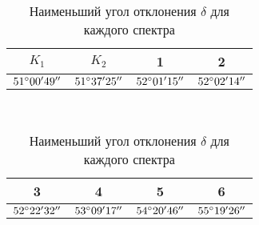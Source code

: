 \begin{table}[h!]
    \centering
    \begin{tabular}{|c|c|c|c|}
    \hline
    $K_1$                 & $K_2$                 & 1                     & 2                     \\ \hline
    $51 \degree 00' 49''$ & $51 \degree 37' 25''$ & $52 \degree 01' 15''$ & $52 \degree 02' 14''$ \\ \hline
    \end{tabular}
    \\[3 mm]
    \begin{tabular}{|c|c|c|c|}
        \hline
        3                     & 4                     & 5                     & 6                      \\ \hline
        $52 \degree 22' 32''$ & $53 \degree 09' 17''$ & $54 \degree 20' 46''$ & $55 \degree 19' 26''$  \\ \hline
    \end{tabular}

    \caption{Наименьший угол отклонения $\delta$ для каждого спектра}
    \label{tabel:spectr}
\end{table}